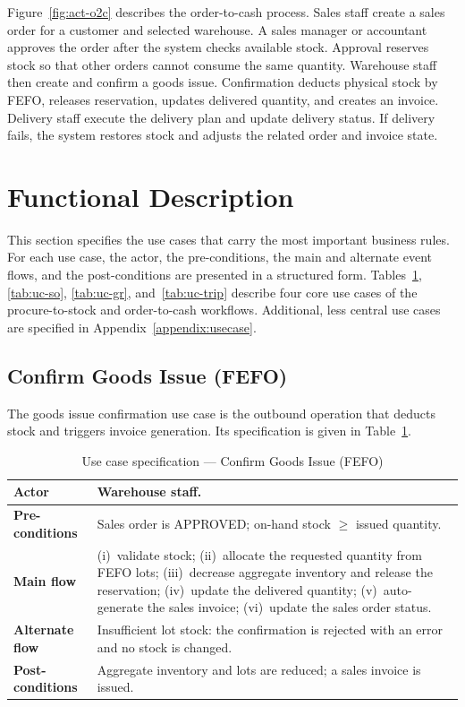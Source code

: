 Figure~\ref{fig:act-o2c} describes the order-to-cash process. Sales staff create
a sales order for a customer and selected warehouse. A sales manager or
accountant approves the order after the system checks available stock. Approval
reserves stock so that other orders cannot consume the same quantity. Warehouse
staff then create and confirm a goods issue. Confirmation deducts physical stock
by FEFO, releases reservation, updates delivered quantity, and creates an
invoice. Delivery staff execute the delivery plan and update delivery status. If
delivery fails, the system restores stock and adjusts the related order and
invoice state.

\section{Functional Description}
This section specifies the use cases that carry the most important business
rules. For each use case, the actor, the pre-conditions, the main and alternate
event flows, and the post-conditions are presented in a structured form.
Tables~\ref{tab:uc-gi}, \ref{tab:uc-so}, \ref{tab:uc-gr},
and~\ref{tab:uc-trip} describe four core use cases of the procure-to-stock and
order-to-cash workflows. Additional, less central use cases are specified in
Appendix~\ref{appendix:usecase}.

\subsection{Confirm Goods Issue (FEFO)}
The goods issue confirmation use case is the outbound operation that deducts
stock and triggers invoice generation. Its specification is given in
Table~\ref{tab:uc-gi}.
\begin{table}[H]\centering
\caption{Use case specification --- Confirm Goods Issue (FEFO)}
\label{tab:uc-gi}
\begin{tabular}{|p{3cm}|p{11cm}|}
\hline
\textbf{Actor} & Warehouse staff. \\ \hline
\textbf{Pre-conditions} & Sales order is APPROVED; on-hand stock $\geq$ issued quantity. \\ \hline
\textbf{Main flow} & (i)~validate stock; (ii)~allocate the requested quantity from FEFO lots; (iii)~decrease aggregate inventory and release the reservation; (iv)~update the delivered quantity; (v)~auto-generate the sales invoice; (vi)~update the sales order status. \\ \hline
\textbf{Alternate flow} & Insufficient lot stock: the confirmation is rejected with an error and no stock is changed. \\ \hline
\textbf{Post-conditions} & Aggregate inventory and lots are reduced; a sales invoice is issued. \\ \hline
\end{tabular}
\end{table}

